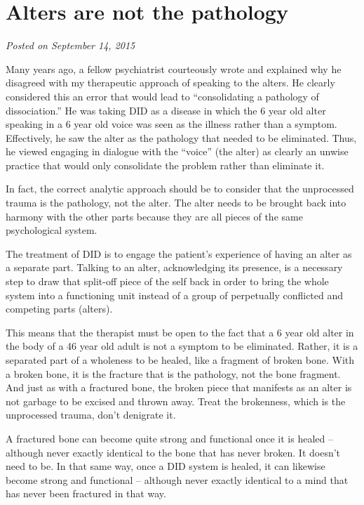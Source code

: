 \documentclass[]{book}
\begin{document}
\hypertarget{alters-are-not-the-pathology}{%
\section{Alters are not the pathology}\label{alters-are-not-the-pathology}}

\emph{Posted on September 14, 2015}

Many years ago, a fellow psychiatrist courteously wrote and explained why he disagreed with my therapeutic approach of speaking to the alters. He clearly considered this an error that would lead to ``consolidating a pathology of dissociation.'' He was taking DID as a disease in which the 6 year old alter speaking in a 6 year old voice was seen as the illness rather than a symptom. Effectively, he saw the alter as the pathology that needed to be eliminated. Thus, he viewed engaging in dialogue with the ``voice'' (the alter) as clearly an unwise practice that would only consolidate the problem rather than eliminate it.

In fact, the correct analytic approach should be to consider that the unprocessed trauma is the pathology, not the alter. The alter needs to be brought back into harmony with the other parts because they are all pieces of the same psychological system.

The treatment of DID is to engage the patient's experience of having an alter as a separate part. Talking to an alter, acknowledging its presence, is a necessary step to draw that split-off piece of the self back in order to bring the whole system into a functioning unit instead of a group of perpetually conflicted and competing parts (alters).

This means that the therapist must be open to the fact that a 6 year old alter in the body of a 46 year old adult is not a symptom to be eliminated. Rather, it is a separated part of a wholeness to be healed, like a fragment of broken bone. With a broken bone, it is the fracture that is the pathology, not the bone fragment. And just as with a fractured bone, the broken piece that manifests as an alter is not garbage to be excised and thrown away. Treat the brokenness, which is the unprocessed trauma, don't denigrate it.

A fractured bone can become quite strong and functional once it is healed -- although never exactly identical to the bone that has never broken. It doesn't need to be. In that same way, once a DID system is healed, it can likewise become strong and functional -- although never exactly identical to a mind that has never been fractured in that way.
\end{document}
